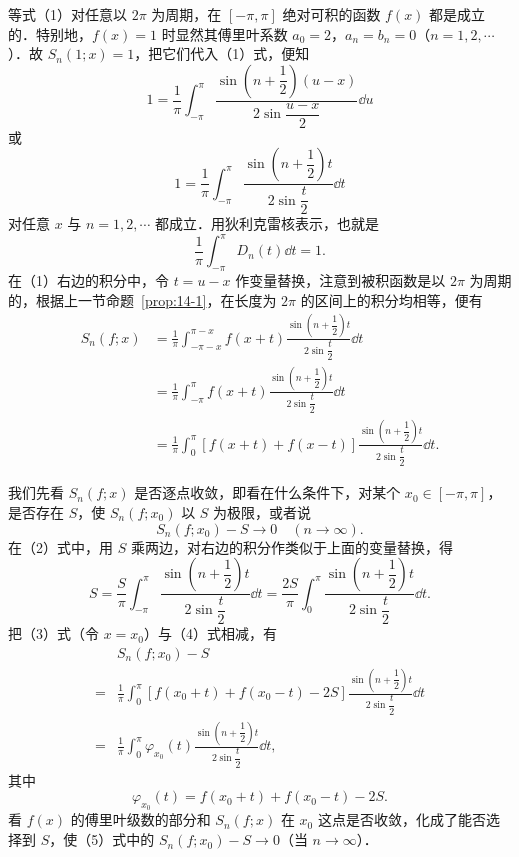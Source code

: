 等式（1）对任意以 $2\pi$ 为周期，在 $[-\pi,\pi]$ 绝对可积的函数 $f(x)$ 都是成立的．特别地，$f(x)=1$ 时显然其傅里叶系数 $a_{0}=2$，$a_{n}=b_{n}=0$（$n=1,2,\cdots$）．故 $S_{n}(1;x)=1$，把它们代入（1）式，便知
\[
1=\frac{1}{\pi}\int_{-\pi}^{\pi}\frac{\sin\left(n+\dfrac{1}{2}\right)(u-x)}{2\sin\dfrac{u-x}{2}}\dd u
\]
或
\begin{equation}
1=\frac{1}{\pi}\int_{-\pi}^{\pi}\frac{\sin\left(n+\dfrac{1}{2}\right)t}{2\sin\dfrac{t}{2}}\dd t
\tag{2}
\end{equation}
对任意 $x$ 与 $n=1,2,\cdots$ 都成立．用狄利克雷核表示，也就是
\[
\frac{1}{\pi}\int_{-\pi}^{\pi}D_{n}(t)\dd t=1.
\]
在（1）右边的积分中，令 $t=u-x$ 作变量替换，注意到被积函数是以 $2\pi$ 为周期的，根据上一节命题~\ref{prop:14-1}，在长度为 $2\pi$ 的区间上的积分均相等，便有
\begin{equation}
\begin{aligned}
S_{n}(f;x)&=\frac{1}{\pi}\int_{-\pi-x}^{\pi-x}f(x+t)\frac{\sin\left(n+\dfrac{1}{2}\right)t}{2\sin\dfrac{t}{2}}\dd t\\
&=\frac{1}{\pi}\int_{-\pi}^{\pi}f(x+t)\frac{\sin\left(n+\dfrac{1}{2}\right)t}{2\sin\dfrac{t}{2}}\dd t\\
&=\frac{1}{\pi}\int_{0}^{\pi}\left[f(x+t)+f(x-t)\right]\frac{\sin\left(n+\dfrac{1}{2}\right)t}{2\sin\dfrac{t}{2}}\dd t.
\end{aligned}
\tag{3}
\end{equation}

我们先看 $S_{n}(f;x)$ 是否逐点收敛，即看在什么条件下，对某个 $x_{0}\in[-\pi,\pi]$，是否存在 $S$，使 $S_{n}(f;x_{0})$ 以 $S$ 为极限，或者说
\[
S_{n}(f;x_{0})-S\to 0\quad(n\to\infty).
\]
在（2）式中，用 $S$ 乘两边，对右边的积分作类似于上面的变量替换，得
\begin{equation}
S=\frac{S}{\pi}\int_{-\pi}^{\pi}\frac{\sin\left(n+\dfrac{1}{2}\right)t}{2\sin\dfrac{t}{2}}\dd t=\frac{2S}{\pi}\int_{0}^{\pi}\frac{\sin\left(n+\dfrac{1}{2}\right)t}{2\sin\dfrac{t}{2}}\dd t.
\tag{4}
\end{equation}
把（3）式（令 $x=x_{0}$）与（4）式相减，有
\begin{equation}
\begin{aligned}
&S_{n}(f;x_{0})-S\\
={}&\frac{1}{\pi}\int_{0}^{\pi}\left[f(x_{0}+t)+f(x_{0}-t)-2S\right]\frac{\sin\left(n+\dfrac{1}{2}\right)t}{2\sin\dfrac{t}{2}}\dd t\\
={}&\frac{1}{\pi}\int_{0}^{\pi}\varphi_{x_{0}}(t)\frac{\sin\left(n+\dfrac{1}{2}\right)t}{2\sin\dfrac{t}{2}}\dd t,
\end{aligned}
\tag{5}
\end{equation}
其中
\[
\varphi_{x_{0}}(t)=f(x_{0}+t)+f(x_{0}-t)-2S.
\]
看 $f(x)$ 的傅里叶级数的部分和 $S_{n}(f;x)$ 在 $x_{0}$ 这点是否收敛，化成了能否选择到 $S$，使（5）式中的 $S_{n}(f;x_{0})-S\to 0$（当 $n\to\infty$）．


